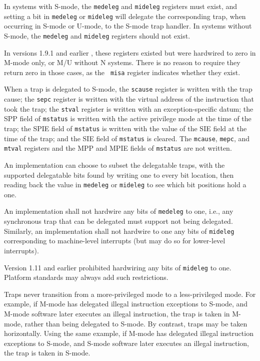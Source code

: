 In systems with S-mode, the {\tt medeleg} and {\tt mideleg} registers
must exist, and setting a bit in
{\tt medeleg} or {\tt mideleg} will delegate the corresponding trap, when
occurring in S-mode or U-mode, to the S-mode trap handler.
In systems without S-mode, the {\tt medeleg} and {\tt mideleg} registers
should not exist.

\begin{commentary}
  In versions 1.9.1 and earlier , these registers existed but were
  hardwired to zero in M-mode only, or M/U without N systems.  There
  is no reason to require they return zero in those cases, as the {\tt
    misa} register indicates whether they exist.
\end{commentary}


When a trap is delegated to S-mode, the
{\tt scause} register is written with the trap cause; the
{\tt sepc} register is written with the virtual address of
the instruction that took the trap; the
{\tt stval} register is written with an
exception-specific datum; the SPP field
of {\tt mstatus} is written with the active privilege mode at the time of
the trap; the SPIE field of {\tt mstatus} is written with the
value of the SIE field at the time of the trap; and
the SIE field of {\tt mstatus} is cleared.
The {\tt mcause}, {\tt mepc}, and {\tt mtval} registers and the MPP and
MPIE fields of {\tt mstatus} are not written.

An
implementation can choose to subset the delegatable traps, with the
supported delegatable bits found by writing one to every bit location,
then reading back the value in {\tt medeleg} or {\tt mideleg} to see
which bit positions hold a one.

An implementation shall not hardwire any bits of {\tt medeleg} to one, i.e.,
any synchronous trap that can be delegated must support not being delegated.
Similarly, an implementation shall not hardwire to one any bits of
{\tt mideleg} corresponding to machine-level interrupts (but may do so
for lower-level interrupts).

\begin{commentary}
Version 1.11 and earlier prohibited hardwiring any bits of {\tt mideleg}
to one.
Platform standards may always add such restrictions.
\end{commentary}

Traps never transition from a more-privileged mode to a less-privileged mode.
For example, if M-mode has delegated illegal instruction exceptions to S-mode, and
M-mode software later executes an illegal instruction, the trap is taken in
M-mode, rather than being delegated to S-mode.  By contrast, traps may be
taken horizontally.  Using the same example, if M-mode has delegated illegal
instruction exceptions to S-mode, and S-mode software later executes an illegal
instruction, the trap is taken in S-mode.

